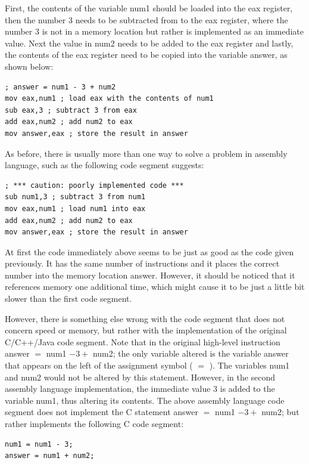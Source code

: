 \documentclass[10pt]{book}
\begin{document}
First, the contents of the variable num1 should be loaded into the eax register, then the number 3 needs to be subtracted from to the eax register, where the number 3 is not in a memory location but rather is implemented as an immediate\\
value. Next the value in num2 needs to be added to the eax register and lastly, the contents of the eax register need to be copied into the variable answer, as shown below:

\begin{verbatim}
; answer = num1 - 3 + num2
mov eax,num1 ; load eax with the contents of num1
sub eax,3 ; subtract 3 from eax
add eax,num2 ; add num2 to eax
mov answer,eax ; store the result in answer
\end{verbatim}

As before, there is usually more than one way to solve a problem in assembly language, such as the following code segment suggests:

\begin{verbatim}
; *** caution: poorly implemented code ***
sub num1,3 ; subtract 3 from num1
mov eax,num1 ; load num1 into eax
add eax,num2 ; add num2 to eax
mov answer,eax ; store the result in answer
\end{verbatim}

At first the code immediately above seems to be just as good as the code given previously. It has the same number of instructions and it places the correct number into the memory location answer. However, it should be noticed that it references memory one additional time, which might cause it to be just a little bit slower than the first code segment.

However, there is something else wrong with the code segment that does not concern speed or memory, but rather with the implementation of the original C/C++/Java code segment. Note that in the original high-level instruction answer $=$ num1 $-3+$ num2; the only variable altered is the variable answer that appears on the left of the assignment symbol ( $=$ ). The variables num1 and num2 would not be altered by this statement. However, in the second assembly language implementation, the immediate value 3 is added to the variable num1, thus altering its contents. The above assembly language code segment does not implement the C statement answer $=$ num1 $-3+$ num2; but rather implements the following C code segment:

\begin{verbatim}
num1 = num1 - 3;
answer = num1 + num2;
\end{verbatim}
\end{document}
